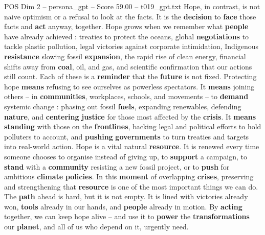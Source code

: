 \begin{textsample}{POS Dim 2 – persona\_gpt – Score 59.00 – t019\_gpt.txt}
Hope, in contrast, is not naive optimism or a refusal to look at the facts.
It is the \textbf{decision} to \textbf{face} those facts and \textbf{act} anyway, together.
Hope grows when we remember what \textbf{people} have already achieved : treaties to protect the oceans, global \textbf{negotiations} to tackle plastic pollution, legal victories against corporate intimidation, Indigenous \textbf{resistance} slowing fossil \textbf{expansion}, the rapid rise of clean energy, financial shifts away from \textbf{coal}, oil, and gas, and scientific confirmation that our actions still count.
Each of these is a \textbf{reminder} that the \textbf{future} is not fixed.
Protecting hope \textbf{means} refusing to see ourselves as powerless spectators.
It \textbf{means} joining others – in \textbf{communities}, workplaces, schools, and movements – to \textbf{demand} systemic change : phasing out fossil \textbf{fuels}, expanding renewables, defending \textbf{nature}, and \textbf{centering} \textbf{justice} for those most affected by the \textbf{crisis}.
It \textbf{means} \textbf{standing} with those on the \textbf{frontlines}, backing legal and political efforts to hold polluters to account, and \textbf{pushing} \textbf{governments} to turn treaties and targets into real-world action.
Hope is a vital natural \textbf{resource}.
It is renewed every time someone chooses to organise instead of giving up, to \textbf{support} a campaign, to \textbf{stand} with a \textbf{community} resisting a new fossil project, or to \textbf{push} for ambitious \textbf{climate} \textbf{policies}.
In this \textbf{moment} of overlapping \textbf{crises}, preserving and strengthening that \textbf{resource} is one of the most important things we can do.
The \textbf{path} ahead is hard, but it is not empty.
It is lined with victories already won, \textbf{tools} already in our hands, and \textbf{people} already in motion.
By \textbf{acting} together, we can keep hope alive – and use it to \textbf{power} the \textbf{transformations} our \textbf{planet}, and all of us who depend on it, urgently need.

\end{textsample}
